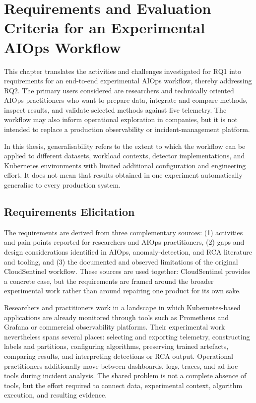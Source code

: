 \chapter{Requirements and Evaluation Criteria for an Experimental AIOps Workflow}%
\label{ch:requirements_for_framework}
This chapter translates the activities and challenges investigated for RQ1 into requirements for an end-to-end experimental AIOps workflow, thereby addressing RQ2. The primary users considered are researchers and technically oriented AIOps practitioners who want to prepare data, integrate and compare methods, inspect results, and validate selected methods against live telemetry. The workflow may also inform operational exploration in companies, but it is not intended to replace a production observability or incident-management platform.

In this thesis, generalisability refers to the extent to which the workflow can be applied to different datasets, workload contexts, detector implementations, and Kubernetes environments with limited additional configuration and engineering effort. It does not mean that results obtained in one experiment automatically generalise to every production system.

\section{Requirements Elicitation}
The requirements are derived from three complementary sources: (1) activities and pain points reported for researchers and AIOps practitioners, (2) gaps and design considerations identified in AIOps, anomaly-detection, and RCA literature and tooling, and (3) the documented and observed limitations of the original CloudSentinel workflow. These sources are used together: CloudSentinel provides a concrete case, but the requirements are framed around the broader experimental work rather than around repairing one product for its own sake.


Researchers and practitioners work in a landscape in which Kubernetes-based applications are already monitored through tools such as Prometheus and Grafana or commercial observability platforms. Their experimental work nevertheless spans several places: selecting and exporting telemetry, constructing labels and partitions, configuring algorithms, preserving trained artefacts, comparing results, and interpreting detections or RCA output. Operational practitioners additionally move between dashboards, logs, traces, and ad-hoc tools during incident analysis. The shared problem is not a complete absence of tools, but the effort required to connect data, experimental context, algorithm execution, and resulting evidence.

